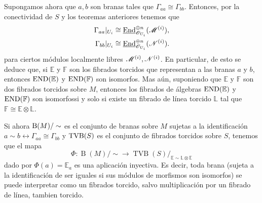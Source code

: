 {Supongamos ahora que $a,b$ son branas tales que $\Gamma_{aa}\cong \Gamma_{bb}$. Entonces, por la conectividad de $S$ y los teoremas anteriores tenemos que
$$
\begin{aligned}
\Gamma_{aa}|_{U_i}&\cong \underline{\operatorname{End}}^{\oplus n}_{\mathscr{O}_{U_i}}(\mathscr{M}^{(i)}), \\
\Gamma_{bb}|_{U_i}&\cong \underline{\operatorname{End}}^{\oplus n}_{\mathscr{O}_{U_i}}(\mathscr{N}^{(i)}). \\
\end{aligned}
$$
para ciertos m\'odulos localmente libres $\mathscr{M}^{(i)},\mathscr{N}^{(i)}$. En particular, de esto se deduce que, si $\mathbb{E}$ y $\mathbb{F}$ son los fibrados torcidos que representan a las branas $a$ y $b$, entonces $\operatorname{END}(\mathbb{E})$ y $\operatorname{END}(\mathbb{F})$ son isomorfos. Mas a\'un, suponiendo que $\mathbb{E}$ y $\mathbb{F}$ son dos fibrados torcidos sobre $M$, entonces los fibrados de \'algebras $\operatorname{END}(\mathbb{E})$ y $\operatorname{END}(\mathbb{F})$ son isomorfossi y solo si existe un fibrado de l\'inea torcido $\mathbb{L}$ tal que $\mathbb{F}\cong \mathbb{E}\otimes \mathbb{L}$.

Si ahora $\operatorname{B}(M)/\sim$ es el conjunto de branas sobre $M$ sujetas a la identificaci\'on $a\sim b \longleftrightarrow \Gamma_{aa}\cong \Gamma_{bb}$ y $\operatorname{TVB}(S)$ es el conjunto de fibrados torcidos sobre $S$, tenemos que el mapa
$$\Phi :\operatorname{B}(M)/\sim \longrightarrow \operatorname{TVB}(S)/_{\mathbb{E}\sim \mathbb{L}\otimes \mathbb{E}}$$
dado por $\Phi (a)=\mathbb{E}_a$ es una aplicaci\'on inyectiva. Es decir, toda brana (sujeta a la identificaci\'on de ser iguales si sus m\'odulos de morfismos son isomorfos) se puede interpretar como un fibrados torcido, salvo multiplicaci\'on por un fibrado de l\'inea, tambien torcido.








}